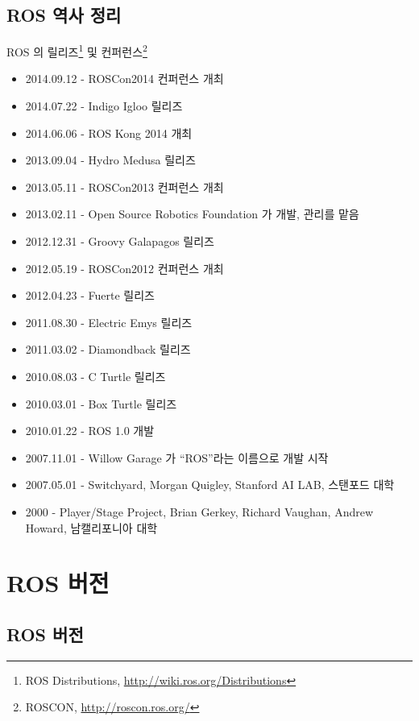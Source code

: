 \subsection{ROS 역사 정리}

ROS 의 릴리즈\footnote{ROS Distributions, \url{http://wiki.ros.org/Distributions}} 및 컨퍼런스\footnote{ROSCON, \url{http://roscon.ros.org/}}

\begin{itemize}
\item 2014.09.12 - ROSCon2014 컨퍼런스 개최
\item 2014.07.22 - Indigo Igloo 릴리즈
\item 2014.06.06 - ROS Kong 2014 개최
\item 2013.09.04 - Hydro Medusa 릴리즈
\item 2013.05.11 - ROSCon2013 컨퍼런스 개최
\item 2013.02.11 - Open Source Robotics Foundation 가 개발, 관리를 맡음
\item 2012.12.31 - Groovy Galapagos 릴리즈
\item 2012.05.19 - ROSCon2012 컨퍼런스 개최
\item 2012.04.23 - Fuerte 릴리즈
\item 2011.08.30 - Electric Emys 릴리즈
\item 2011.03.02 - Diamondback 릴리즈
\item 2010.08.03 - C Turtle 릴리즈
\item 2010.03.01 - Box Turtle 릴리즈
\item 2010.01.22 - ROS 1.0 개발
\item 2007.11.01 - Willow Garage 가 “ROS”라는 이름으로 개발 시작
\item 2007.05.01 - Switchyard, Morgan Quigley, Stanford AI LAB, 스탠포드 대학
\item 2000 - Player/Stage Project, Brian Gerkey, Richard Vaughan, Andrew Howard, 남캘리포니아 대학
\end{itemize}


\section{ROS 버전}

\subsection{ROS 버전}

